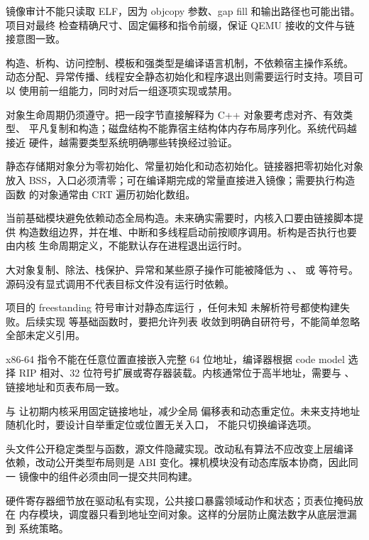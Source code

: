 镜像审计不能只读取 ELF，因为 objcopy 参数、gap fill 和输出路径也可能出错。
项目对最终  检查精确尺寸、固定偏移和指令前缀，保证
QEMU 接收的文件与链接意图一致。


构造、析构、访问控制、模板和强类型是编译语言机制，不依赖宿主操作系统。
动态分配、异常传播、线程安全静态初始化和程序退出则需要运行时支持。项目可以
使用前一组能力，同时对后一组逐项实现或禁用。

对象生命周期仍须遵守。把一段字节直接解释为 C++ 对象要考虑对齐、有效类型、
平凡复制和构造；磁盘结构不能靠宿主结构体内存布局序列化。系统代码越接近
硬件，越需要类型系统明确哪些转换经过验证。

静态存储期对象分为零初始化、常量初始化和动态初始化。链接器把零初始化对象
放入 BSS，入口必须清零；可在编译期完成的常量直接进入镜像；需要执行构造函数
的对象通常由 CRT 遍历初始化数组。

当前基础模块避免依赖动态全局构造。未来确实需要时，内核入口要由链接脚本提供
构造数组边界，并在堆、中断和多线程启动前按顺序调用。析构是否执行也要由内核
生命周期定义，不能默认存在进程退出运行时。

大对象复制、除法、栈保护、异常和某些原子操作可能被降低为
、、 或
 等符号。源码没有显式调用不代表目标文件没有运行时依赖。

项目的 freestanding 符号审计对静态库运行 ，任何未知
未解析符号都使构建失败。后续实现  等基础函数时，要把允许列表
收敛到明确自研符号，不能简单忽略全部未定义引用。

x86-64 指令不能在任意位置直接嵌入完整 64 位地址，编译器根据 code model
选择 RIP 相对、32 位符号扩展或寄存器装载。内核通常位于高半地址，需要与
、链接地址和页表布局一致。

 与  让初期内核采用固定链接地址，减少全局
偏移表和动态重定位。未来支持地址随机化时，要设计自举重定位或位置无关入口，
不能只切换编译选项。

头文件公开稳定类型与函数，源文件隐藏实现。改动私有算法不应改变上层编译
依赖，改动公开类型布局则是 ABI 变化。裸机模块没有动态库版本协商，因此同一
镜像中的组件必须由同一提交共同构建。

硬件寄存器细节放在驱动私有实现，公共接口暴露领域动作和状态；页表位掩码放在
内存模块，调度器只看到地址空间对象。这样的分层防止魔法数字从底层泄漏到
系统策略。


